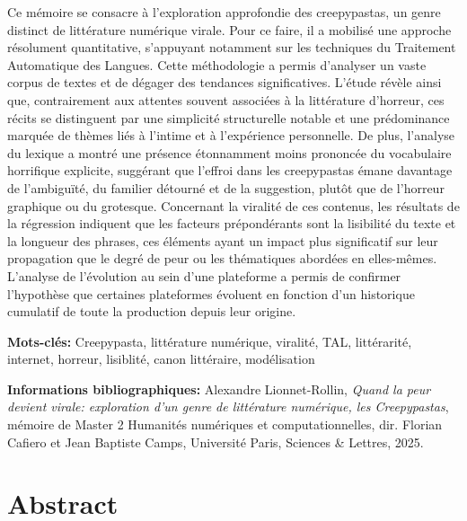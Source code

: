 \documentclass[12pt,a4paper,oneside,titlepage]{book} %
\begin{document}
Ce mémoire se consacre à l'exploration approfondie des creepypastas, un genre distinct de littérature numérique virale. Pour ce faire, il a mobilisé une approche résolument quantitative, s'appuyant notamment sur les techniques du Traitement Automatique des Langues. Cette méthodologie a permis d'analyser un vaste corpus de textes et de dégager des tendances significatives. L'étude révèle ainsi que, contrairement aux attentes souvent associées à la littérature d'horreur, ces récits se distinguent par une simplicité structurelle notable et une prédominance marquée de thèmes liés à l'intime et à l'expérience personnelle. De plus, l'analyse du lexique a montré une présence étonnamment moins prononcée du vocabulaire horrifique explicite, suggérant que l'effroi dans les creepypastas émane davantage de l'ambiguïté, du familier détourné et de la suggestion, plutôt que de l'horreur graphique ou du grotesque. Concernant la viralité de ces contenus, les résultats de la régression indiquent que les facteurs prépondérants sont la lisibilité du texte et la longueur des phrases, ces éléments ayant un impact plus significatif sur leur propagation que le degré de peur ou les thématiques abordées en elles-mêmes. L’analyse de l’évolution au sein d’une plateforme a permis de confirmer l’hypothèse que certaines plateformes évoluent en fonction d’un historique cumulatif de toute la production depuis leur origine.

\medskip

\textbf{Mots-clés:} Creepypasta, littérature numérique, viralité, TAL, littérarité, internet, horreur, lisiblité, canon littéraire, modélisation

\textbf{Informations bibliographiques:} Alexandre Lionnet-Rollin, \textit{Quand la peur devient virale: exploration d'un genre de littérature numérique, les Creepypastas}, mémoire de Master 2 \og Humanités numériques et computationnelles\fg{}, dir. Florian Cafiero et Jean Baptiste Camps, Université Paris, Sciences \& Lettres, 2025.


\pagebreak
\section*{Abstract}
\end{document}
